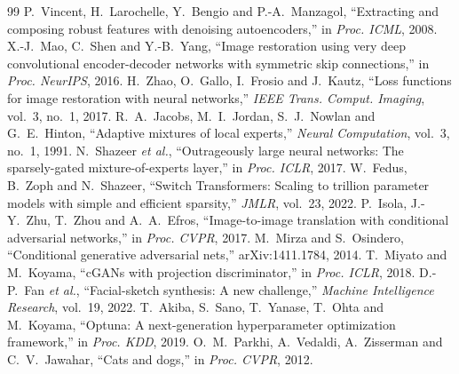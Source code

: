 \documentclass[conference]{IEEEtran}
\begin{document}

\begin{thebibliography}{99}
 P.~Vincent, H.~Larochelle, Y.~Bengio and P.-A.~Manzagol, ``Extracting and composing robust features with denoising autoencoders,'' in \emph{Proc. ICML}, 2008.
 X.-J.~Mao, C.~Shen and Y.-B.~Yang, ``Image restoration using very deep convolutional encoder-decoder networks with symmetric skip connections,'' in \emph{Proc. NeurIPS}, 2016.
 H.~Zhao, O.~Gallo, I.~Frosio and J.~Kautz, ``Loss functions for image restoration with neural networks,'' \emph{IEEE Trans. Comput. Imaging}, vol.~3, no.~1, 2017.
 R.~A.~Jacobs, M.~I.~Jordan, S.~J.~Nowlan and G.~E.~Hinton, ``Adaptive mixtures of local experts,'' \emph{Neural Computation}, vol.~3, no.~1, 1991.
 N.~Shazeer \emph{et al.}, ``Outrageously large neural networks: The sparsely-gated mixture-of-experts layer,'' in \emph{Proc. ICLR}, 2017.
 W.~Fedus, B.~Zoph and N.~Shazeer, ``Switch Transformers: Scaling to trillion parameter models with simple and efficient sparsity,'' \emph{JMLR}, vol.~23, 2022.
 P.~Isola, J.-Y.~Zhu, T.~Zhou and A.~A.~Efros, ``Image-to-image translation with conditional adversarial networks,'' in \emph{Proc. CVPR}, 2017.
 M.~Mirza and S.~Osindero, ``Conditional generative adversarial nets,'' arXiv:1411.1784, 2014.
 T.~Miyato and M.~Koyama, ``cGANs with projection discriminator,'' in \emph{Proc. ICLR}, 2018.
 D.-P.~Fan \emph{et al.}, ``Facial-sketch synthesis: A new challenge,'' \emph{Machine Intelligence Research}, vol.~19, 2022.
 T.~Akiba, S.~Sano, T.~Yanase, T.~Ohta and M.~Koyama, ``Optuna: A next-generation hyperparameter optimization framework,'' in \emph{Proc. KDD}, 2019.
 O.~M.~Parkhi, A.~Vedaldi, A.~Zisserman and C.~V.~Jawahar, ``Cats and dogs,'' in \emph{Proc. CVPR}, 2012.
\end{thebibliography}
\end{document}
